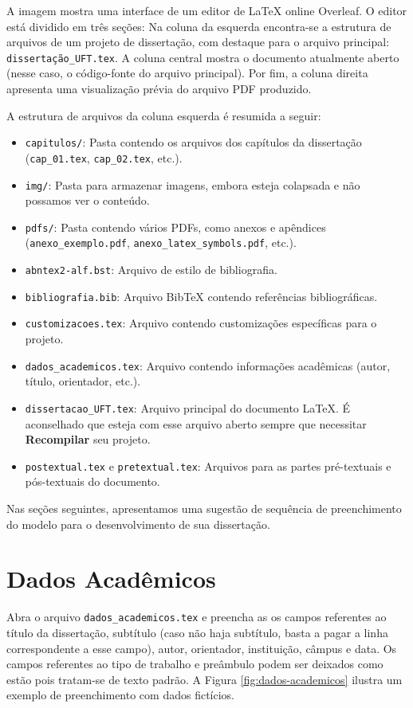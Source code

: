\begin{apendicesenv}
A imagem mostra uma interface de um editor de LaTeX online  Overleaf. O editor está dividido em três seções:  Na coluna da esquerda encontra-se a estrutura de arquivos de um projeto de dissertação, com destaque para o arquivo principal: \verb|dissertação_UFT.tex|. A coluna central mostra o documento atualmente aberto (nesse caso, o código-fonte do arquivo principal). Por fim, a coluna direita apresenta uma visualização prévia do arquivo PDF produzido. 

A estrutura de arquivos da coluna esquerda é resumida a seguir:
    \begin{itemize}
        \item \verb|capitulos/|: Pasta contendo os arquivos dos capítulos da dissertação (\verb|cap_01.tex|, \verb|cap_02.tex|, etc.).
        \item \verb|img/|: Pasta para armazenar imagens, embora esteja colapsada e não possamos ver o conteúdo.
        \item \verb|pdfs/|: Pasta contendo vários PDFs, como anexos e apêndices (\verb|anexo_exemplo.pdf|, \verb|anexo_latex_symbols.pdf|, etc.).
        \item \verb|abntex2-alf.bst|: Arquivo de estilo de bibliografia.
        \item \verb|bibliografia.bib|: Arquivo BibTeX contendo referências bibliográficas.
        \item \verb|customizacoes.tex|: Arquivo contendo customizações específicas para o projeto.
        \item \verb|dados_academicos.tex|: Arquivo contendo informações acadêmicas (autor, título, orientador, etc.).
        \item \verb|dissertacao_UFT.tex|: Arquivo principal do documento LaTeX. É aconselhado que esteja com esse arquivo aberto sempre que necessitar \textbf{Recompilar} seu projeto.
        \item \verb|postextual.tex| e \verb|pretextual.tex|: Arquivos para as partes pré-textuais e pós-textuais do documento.
    \end{itemize}

Nas seções seguintes, apresentamos uma sugestão de sequência de preenchimento do modelo para o desenvolvimento de sua dissertação.

\section*{Dados Acadêmicos}

Abra o arquivo \verb|dados_academicos.tex| e preencha as os campos referentes ao título da dissertação, subtítulo (caso não haja subtítulo, basta a pagar a linha correspondente a esse campo), autor, orientador, instituição, câmpus e data. Os campos referentes ao tipo de trabalho e preâmbulo podem ser deixados como estão pois tratam-se de texto padrão. A Figura \ref{fig:dados-academicos} ilustra um exemplo de preenchimento com dados fictícios.


\end{apendicesenv}
